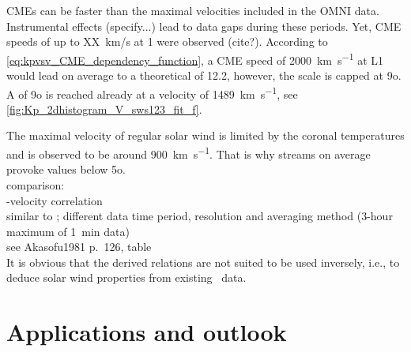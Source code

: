 CMEs can be faster than the maximal velocities included in the OMNI data. Instrumental effects (specify...) lead to data gaps during these periods. Yet, CME speeds of up to XX~km/s at \SI{1}{\au} were observed (cite?). According to \autoref{eq:kpvsv_CME_dependency_function}, a CME speed of \SI{2000}{\km\per\s} at L1 would lead on average to a theoretical \Kp{} of 12.2, however, the \Kp{} scale is capped at 9o. A \Kp{} of 9o is reached already at a velocity of \SI{1489}{\km\per\s}, see \autoref{fig:Kp_2dhistogram_V_sws123_fit_f}.
\begin{figure}
\end{figure}

The maximal velocity of regular solar wind is limited by the coronal temperatures \citep{Parker1958} and is observed to be around \SI{900}{\km\per\s}. That is why streams on average provoke \Kp{} values below 5o.\\

comparison:\\
\Kp-velocity correlation\\
similar to \citet{Elliott2013}; different data time period, resolution and averaging method (3-hour maximum of 1~min data)\\
see Akasofu1981 p.~126, table\\


It is obvious that the derived relations are not suited to be used inversely, i.e., to deduce solar wind properties from existing \Kp{}~data.\\


\section{Applications and outlook}

